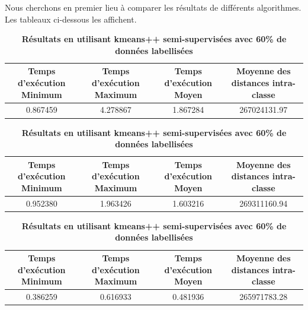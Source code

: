 \documentclass[12pt,a4paper]{book}
\newcommand{\1}{\mathds{1}}
\begin{document}
\noindent
Nous cherchons en premier lieu à comparer les résultats de différents algorithmes. Les tableaux ci-dessous les affichent.

\begin{table}[ht]

\vspace{5 mm}

\begin{center}
\caption{\textbf{Résultats en utilisant kmeans}} 
\end{center}

\begin{adjustbox}{width=\columnwidth,center}
\begin{tabular}{c|c|c|c}
\hline
\rowcolor{Gray}

Temps d'exécution Minimum & Temps d'exécution Maximum & Temps d'exécution Moyen & Moyenne des distances intra-classe \\
\hline
0.867459&4.278867& 1.867284& \cellcolor{LightCyan}267024131.97\\

\end{tabular}
\end{adjustbox}



\vspace{5 mm}

\begin{center}
\caption{\textbf{Résultats en utilisant kmeans++}} 
\end{center}

\begin{adjustbox}{width=\columnwidth,center}
\begin{tabular}[scale=0.50]{c|c|c|c}
\hline
\rowcolor{Gray}
Temps d'exécution Minimum & Temps d'exécution Maximum & Temps d'exécution Moyen & Moyenne des distances intra-classe \\
\hline
0.952380&1.963426& 1.603216& \cellcolor{LightCyan}269311160.94\\

\end{tabular}
\end{adjustbox}


\vspace{5 mm}

\begin{center}
\caption{\textbf{Résultats en utilisant kmeans++ semi-supervisées avec 60\% de données labellisées}} 
\end{center}

\begin{adjustbox}{width=\columnwidth,center}
\begin{tabular}{c|c|c|c}
\hline
\rowcolor{Gray}
Temps d'exécution Minimum & Temps d'exécution Maximum & Temps d'exécution Moyen & Moyenne des distances intra-classe \\
\hline
0.386259&0.616933& 0.481936& \cellcolor{LightCyan}265971783.28\\
\end{tabular}
\end{adjustbox}


\end{table}
\end{document}
